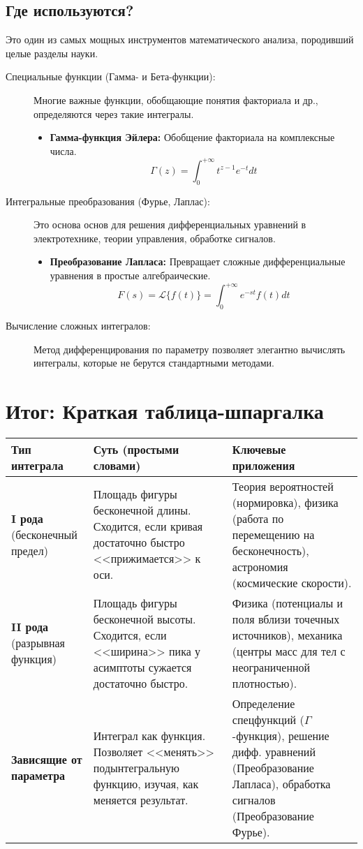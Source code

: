 \documentclass[a4paper, 12pt]{report}
\numberwithin{equation}{section}
\begin{document}
\subsection{Где используются?}
Это один из самых мощных инструментов математического анализа, породивший целые разделы науки.
\begin{description}
	\item[Специальные функции (Гамма- и Бета-функции):] Многие важные функции, обобщающие понятия факториала и др., определяются через такие интегралы.
	\begin{itemize}
		\item \textbf{Гамма-функция Эйлера:} Обобщение факториала на комплексные числа.
		$$ \Gamma(z) = \int_{0}^{+\infty} t^{z-1} e^{-t} dt $$
	\end{itemize}
	
	\item[Интегральные преобразования (Фурье, Лаплас):] Это основа основ для решения дифференциальных уравнений в электротехнике, теории управления, обработке сигналов.
	\begin{itemize}
		\item \textbf{Преобразование Лапласа:} Превращает сложные дифференциальные уравнения в простые алгебраические.
		$$ F(s) = \mathcal{L}\{f(t)\} = \int_{0}^{+\infty} e^{-st} f(t) dt $$
	\end{itemize}
	
	\item[Вычисление сложных интегралов:] Метод дифференцирования по параметру позволяет элегантно вычислять интегралы, которые не берутся стандартными методами.
\end{description}

\section*{Итог: Краткая таблица-шпаргалка}

\begin{center}
	\renewcommand{\arraystretch}{1.5}
	\begin{tabular}{| p{3cm} | p{5.5cm} | p{5.5cm} |}
		\hline
		\textbf{Тип интеграла} & \textbf{Суть (простыми словами)} & \textbf{Ключевые приложения} \\
		\hline \hline
		\textbf{I рода} (бесконечный предел) & Площадь фигуры бесконечной длины. Сходится, если кривая достаточно быстро <<прижимается>> к оси. & Теория вероятностей (нормировка), физика (работа по перемещению на бесконечность), астрономия (космические скорости). \\
		\hline
		\textbf{II рода} (разрывная функция) & Площадь фигуры бесконечной высоты. Сходится, если <<ширина>> пика у асимптоты сужается достаточно быстро. & Физика (потенциалы и поля вблизи точечных источников), механика (центры масс для тел с неограниченной плотностью). \\
		\hline
		\textbf{Зависящие от параметра} & Интеграл как функция. Позволяет <<менять>> подынтегральную функцию, изучая, как меняется результат. & Определение спецфункций ($\Gamma$-функция), решение дифф. уравнений (Преобразование Лапласа), обработка сигналов (Преобразование Фурье). \\
		\hline
	\end{tabular}
\end{center}
\end{document}
